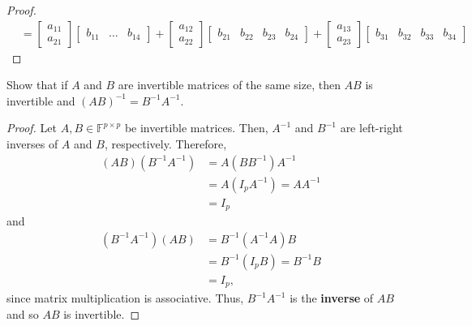 \documentclass[12pt]{article}
\newenvironment{problem}[2][Problem]{\begin{trivlist} \item[\hskip \labelsep {\bfseries #1}\hskip \labelsep {\bfseries #2.}]}{\end{trivlist}}
\begin{document}
\begin{proof}
\begin{align*}
     &= \begin{bmatrix} a_{11}\\ a_{21}\end{bmatrix} \begin{bmatrix} b_{11} & \dots & b_{14} \end{bmatrix}  +
      \begin{bmatrix} a_{12} \\  a_{22}  \end{bmatrix} \begin{bmatrix} b_{21} & b_{22} & b_{23} & b_{24} \end{bmatrix} +
      \begin{bmatrix} a_{13} \\ a_{23}\end{bmatrix} \begin{bmatrix} b_{31} & b_{32} & b_{33} & b_{34} \end{bmatrix}
    \end{align*}
    \end{proof}
    \begin{problem}{1.12}
      Show that if $A$ and $B$ are invertible matrices of the same size, then $AB$ is invertible and $(AB)^{-1} = B^{-1}A^{-1}$. 
    \begin{proof}
      Let $A,B\in \mathbb{F}^{p\times p}$ be invertible matrices. Then, $A^{-1}$ and $B^{-1}$ are left-right inverses of $A$ and $B$, respectively. Therefore,
    \begin{align*}
      (AB)(B^{-1}A^{-1}) &= A(BB^{-1})A^{-1}\\
      &= A(I_{p}A^{-1}) = AA^{-1}\\
      &= I_{p}
    \end{align*}
    and
    \begin{align*}
      (B^{-1}A^{-1})(AB) &= B^{-1}(A^{-1}A)B\\
      &= B^{-1}(I_{p}B) = B^{-1}B\\
      &= I_{p},
    \end{align*}
    since matrix multiplication is associative. Thus, $B^{-1}A^{-1}$ is the \textbf{inverse} of $AB$ and so $AB$ is invertible. 
    \end{proof}
    \end{problem}
\end{document}
